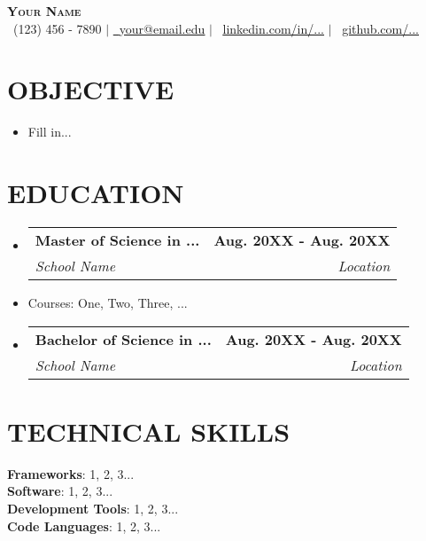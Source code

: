 \documentclass[letterpaper,12pt]{article} %
\makeatletter
\newcommand{\resumeItem}[1]{
  \item\small{
    {#1 \vspace{-2pt}}
  }
}
\newcommand{\resumeSubheading}[4]{
  \vspace{-2pt}\item
    \begin{tabular*}{0.97\textwidth}[t]{l@{\extracolsep{\fill}}r}
      \textbf{#1} & #2 \\
      \textit{\small#3} & \textit{\small #4} \\
    \end{tabular*}\vspace{-7pt}
}
\newcommand{\resumeSubHeadingListStart}{\begin{itemize}[leftmargin=0.15in, label={}]}
\newcommand{\resumeSubHeadingListEnd}{\end{itemize}}
\makeatother
\begin{document}
\vspace*{-1.45cm}
\begin{center}
    \textbf{\Huge \scshape Your Name} \\ \vspace{6pt}
    \faPhone\ \small (123) 456 - 7890 $|$ \href{your@email.edu}
    {\faEnvelope\ \underline{your@email.edu}} $|$ 
    \faLinkedin\ \href{https://www.linkedin.com/in/.../}
    {\underline{linkedin.com/in/...}} $|$
    \faGithub\ \href{https://github.com/...}{\underline{github.com/...}}
\end{center}
\section{\textbf{OBJECTIVE}}
\vspace{0.1em}
  \resumeSubHeadingListStart
    \item{
      \small{
      Fill in...
      }
    }
      \vspace{-0.5em}
  \resumeSubHeadingListEnd
\section{\textbf{EDUCATION}}
  \resumeSubHeadingListStart
    \resumeSubheading
      {Master of Science in ...}{\normalsize\textbf{Aug. 20XX - Aug. 20XX}}
      {School Name}{Location}
          \resumeItem{{Courses}: One, Two, Three, ...}
    \resumeSubheading
      {\normalsize Bachelor of Science in ...}{\normalsize\textbf{Aug. 20XX - Aug. 20XX}}
      {School Name}{Location}
  \resumeSubHeadingListEnd
\section{\textbf{TECHNICAL SKILLS}}
 \begin{itemize}[leftmargin=1em, label={}]
    \small{\item{
     \textbf{Frameworks}{: 1, 2, 3...} \\[3pt]
     \textbf{Software}{: 1, 2, 3...} \\[3pt]
     \textbf{Development Tools}{: 1, 2, 3...} \\[3pt]
     \textbf{Code Languages}{: 1, 2, 3...} \\[3pt]
    }}
 \end{itemize}
\end{document}
